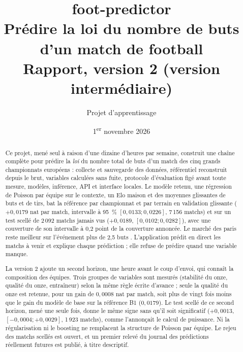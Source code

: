 \documentclass[11pt,a4paper]{report}
\title{foot-predictor\\[0.5em]\large Prédire la loi du nombre de buts d'un match de football\\[0.3em]
\normalsize Rapport, version 2 (version intermédiaire)}
\author{Projet d'apprentissage}
\date{1\textsuperscript{er} novembre 2026}
\begin{document}
\maketitle

\begin{abstract}
Ce projet, mené seul à raison d'une dizaine d'heures par semaine, construit une chaîne complète pour
prédire la \emph{loi} du nombre total de buts d'un match des cinq grands championnats européens :
collecte et sauvegarde des données, référentiel reconstruit depuis le brut, variables calculées sans
fuite, protocole d'évaluation figé avant toute mesure, modèles, inférence, API et interface locales.
Le modèle retenu, une régression de Poisson par équipe sur le contexte, un Elo maison et des moyennes
glissantes de buts et de tirs, bat la référence par championnat et par terrain en validation glissante
(\(+0{,}0179\) nat par match, intervalle à 95~\% \([0{,}0133 ; 0{,}0226]\), 7\,156 matchs) et sur un
test scellé de 2\,092 matchs jamais vus (\(+0{,}0189\), \([0{,}0102 ; 0{,}0282]\)), avec une couverture
de son intervalle à 0,2 point de la couverture annoncée. Le marché des paris reste meilleur sur
l'événement \og plus de 2,5 buts \fg{}. L'application prédit en direct les matchs à venir et explique
chaque prédiction ; elle refuse de prédire quand une variable manque.

La version 2 ajoute un second horizon, une heure avant le coup d'envoi, qui connaît la composition des
équipes. Trois groupes de variables sont mesurés (stabilité du onze, qualité du onze, entraîneur) selon la
même règle écrite d'avance ; seule la qualité du onze est retenue, pour un gain de \(0{,}0008\) nat par
match, soit plus de vingt fois moins que le gain du modèle de base sur la référence B1 (\(0{,}0179\)). Le test scellé de ce
second horizon, mené une seule fois, donne le même signe sans qu'il soit significatif
(\(+0{,}0013\), \([-0{,}0004 ; +0{,}0029]\), 1\,923 matchs), comme l'annonçait le calcul de puissance. Ni la
régularisation ni le boosting ne remplacent la structure de Poisson par équipe. Le rejeu des matchs scellés
est ouvert, et un premier relevé du journal des prédictions réellement futures est publié, à titre
descriptif.
\end{abstract}

\tableofcontents










\appendix




\end{document}
